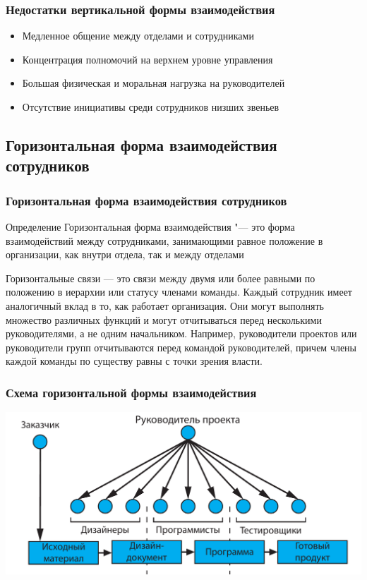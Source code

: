 \documentclass{../industrial-development}
\begin{document}
\begin{frame} \frametitle{Недостатки вертикальной формы взаимодействия}
  
  \begin{itemize}
  \item Медленное общение между отделами и сотрудниками
  \item Концентрация полномочий на верхнем уровне управления
  \item Большая физическая и моральная нагрузка на руководителей
  \item Отсутствие инициативы среди сотрудников низших звеньев
  \end{itemize}
\end{frame}

\subsection{Горизонтальная форма взаимодействия сотрудников}

\begin{frame} \frametitle{Горизонтальная форма взаимодействия сотрудников}
  \begin{block}{Определение}
\alert{Горизонтальная форма взаимодействия} "--- это форма взаимодействий между сотрудниками, занимающими равное положение в организации, как внутри отдела, так и между отделами
  \end{block}
\end{frame}

\lecturenotes
Горизонтальные связи — это связи между двумя или более равными по положению в иерархии или статусу членами команды. Каждый сотрудник имеет аналогичный вклад в то, как работает организация. Они могут выполнять множество различных функций и могут отчитываться перед несколькими руководителями, а не одним начальником. Например, руководители проектов или руководители групп отчитываются перед командой руководителей, причем члены каждой команды по существу равны с точки зрения власти.

\begin{frame} \frametitle{Схема горизонтальной формы взаимодействия}
  \begin{block}{}
\centerline{\includegraphics[width=1\textwidth]{horizontal.pdf}}
  \end{block}
\end{frame}
\end{document}
